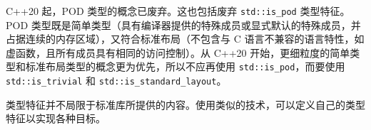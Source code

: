 C++20 起，POD 类型的概念已废弃。这也包括废弃 \verb|std::is_pod| 类型特征。POD 类型既是简单类型（具有编译器提供的特殊成员或显式默认的特殊成员，并占据连续的内存区域），又符合标准布局（不包含与 C 语言不兼容的语言特性，如虚函数，且所有成员具有相同的访问控制）。从 C++20 开始，更细粒度的简单类型和标准布局类型的概念更为优先，所以不应再使用 \verb|std::is_pod|，而要使用 \verb|std::is_trivial| 和 \verb|std::is_standard_layout|。


类型特征并不局限于标准库所提供的内容。使用类似的技术，可以定义自己的类型特征以实现各种目标。

